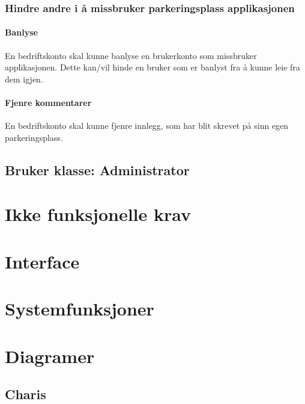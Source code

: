 \documentclass[12pt]{article}
\begin{document}
        \subsubsection{Hindre andre i å missbruker parkeringsplass applikasjonen}

            \paragraph{Banlyse}
            En bedriftskonto skal kunne banlyse en brukerkonto som missbruker applikasjonen. Dette kan/vil hinde en bruker som er banlyst fra å kunne leie fra dem igjen.

            \paragraph{Fjenre kommentarer}
            En bedriftskonto skal kunne fjenre innlegg, som har blit skrevet på sinn egen parkeringsplass.

    \subsection{Bruker klasse: Administrator}
    
\section{Ikke funksjonelle krav}

\section{Interface}

\section{Systemfunksjoner}


\section{Diagramer}

    \subsection{Charis}
\end{document}
